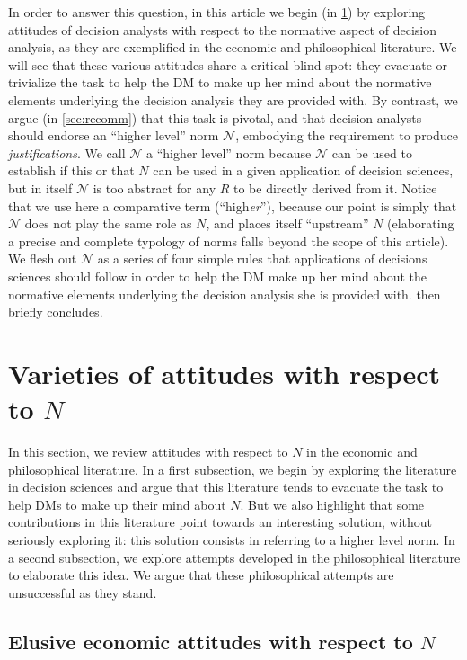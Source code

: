 \documentclass[preprint, french, english, 11pt, authoryear]{elsarticle}%
\newcommand{\protectforpdf}[1]{\texorpdfstring{\ensuremath{#1}}{#1}}
\newcommand{\adv}{\mathscr{N}}
\begin{document}
In order to answer this question, in this article we begin (in \cref{sec:existing}) by exploring attitudes of decision analysts with respect to the normative aspect of decision analysis, as they are exemplified in the economic and philosophical literature. We will see that these various attitudes share a critical blind spot: they evacuate or trivialize the task to help the \ac{DM} to make up her mind about the normative elements underlying the decision analysis they are provided with. By contrast, we argue (in \cref{sec:recomm}) that this task is pivotal, and that decision analysts should endorse an “higher level” norm $\adv$, embodying the requirement to produce \emph{justifications}. We call $\adv$ a “higher level” norm because $\adv$ can be used to establish if this or that $N$ can be used in a given application of decision sciences, but in itself $\adv$ is too abstract for any $R$ to be directly derived from it. Notice that we use here a comparative term (“high\emph{er}”), because our point is simply that $\adv$ does not play the same role as $N$, and places itself “upstream” $N$ (elaborating a precise and complete typology of norms falls beyond the scope of this article). We flesh out $\adv$ as a series of four simple rules that applications of decisions sciences should follow in order to help the \ac{DM} make up her mind about the normative elements underlying the decision analysis she is provided with.  then briefly concludes.

\section{Varieties of attitudes with respect to \protectforpdf{N}}
\label{sec:existing}
In this section, we review attitudes with respect to $N$ in the economic and philosophical literature. In a first subsection, we begin by exploring the literature in decision sciences and argue that this literature tends to evacuate the task to help \acp{DM} to make up their mind about $N$. But we also highlight that some contributions in this literature point towards an interesting solution, without seriously exploring it: this solution consists in referring to a higher level norm. In a second subsection, we explore attempts developed in the philosophical literature to elaborate this idea. We argue that these philosophical attempts are unsuccessful as they stand.

\subsection{Elusive economic attitudes with respect to \protectforpdf{N}}
\end{document}
